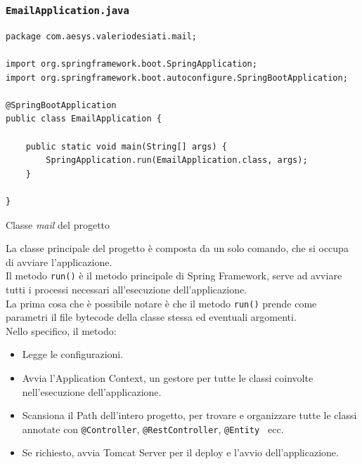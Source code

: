 \subsubsection{\texttt{EmailApplication.java}}
\begin{algorithm}
\centering
\begin{verbatim}
package com.aesys.valeriodesiati.mail;

import org.springframework.boot.SpringApplication;
import org.springframework.boot.autoconfigure.SpringBootApplication;

@SpringBootApplication
public class EmailApplication {
    
    public static void main(String[] args) {
        SpringApplication.run(EmailApplication.class, args);
    }

}
\end{verbatim}
\caption{Classe \emph{mail} del progetto}\label{alg:emailapplication}
\end{algorithm}

La classe principale del progetto è composta da un solo comando, che si occupa di avviare l'applicazione.\\
Il metodo \texttt{run()} è il metodo principale di Spring Framework, serve ad avviare tutti i processi necessari all'esecuzione dell'applicazione.\\
La prima cosa che è possibile notare è che il metodo \texttt{run()} prende come parametri il file bytecode della classe stessa ed eventuali argomenti.\\
Nello specifico, il metodo:
\begin{itemize}
\item Legge le configurazioni.
\item Avvia l'Application Context, un gestore per tutte le classi coinvolte nell'esecuzione dell'applicazione.
\item Scansiona il Path dell'intero progetto, per trovare e organizzare tutte le classi annotate con \texttt{@Controller}, \texttt{@RestController}, \texttt{@Entity } ecc.
\item Se richiesto, avvia Tomcat Server per il deploy e l'avvio dell'applicazione.
\end{itemize}
\newpage
